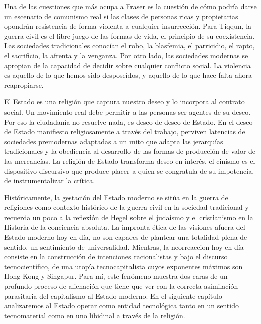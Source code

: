 Una de las cuestiones que más ocupa a Fraser es la cuestión de cómo podría darse un escenario de comunismo real si las clases de personas ricas y propietarias opondrán resistencia de forma violenta a cualquier insurrección. Para Tiqqun, la guerra civil es el libre juego de las formas de vida, el principio de su coexistencia. Las sociedades tradicionales conocían el robo, la blasfemia, el parricidio, el rapto, el sacrificio, la afrenta y la venganza. Por otro lado, las sociedades modernas se apropian de la capacidad de decidir sobre cualquier conflicto social. La violencia es aquello de lo que hemos sido desposeídos, y aquello de lo que hace falta ahora reapropiarse.

El Estado es una religión que captura nuestro deseo y lo incorpora al contrato social. Un movimiento real debe permitir a las personas ser agentes de su deseo. Por eso la ciudadanía no resuelve nada, es deseo de deseo de Estado. En el deseo de Estado manifiesto religiosamente a través del trabajo, perviven latencias de sociedades premodernas adaptadas a un mito que adapta las jerarquías tradicionales y la obediencia al desarrollo de las formas de producción de valor de las mercancías. La religión de Estado transforma deseo en interés. el cinismo es el dispositivo discursivo que produce placer a quien se congratula de su impotencia, de instrumentalizar la crítica.

Históricamente, la gestación del Estado moderno se sitúa en la guerra de religiones como contexto histórico de la guerra civil en la sociedad tradicional y recuerda un poco a la reflexión de Hegel sobre el judaísmo y el cristianismo en la Historia de la conciencia absoluta. La impronta ética de las visiones afuera del Estado moderno hoy en día, no son capaces de plantear una totalidad plena de sentido, un sentimiento de universalidad. Mientras, la neorreaccion hoy en día consiste en la construcción de intenciones racionalistas y bajo el discurso tecnocientífico, de una utopía tecnocapitalista cuyos exponentes máximos son Hong Kong y Singapur. Para mí, este fenómeno muestra dos caras de un profundo proceso de alienación que tiene que ver con la correcta asimilación parasitaria del capitalismo al Estado moderno. En el siguiente capítulo analizaremos al Estado operar como entidad tecnológica tanto en un sentido tecnomaterial como en uno libidinal a través de la religión.